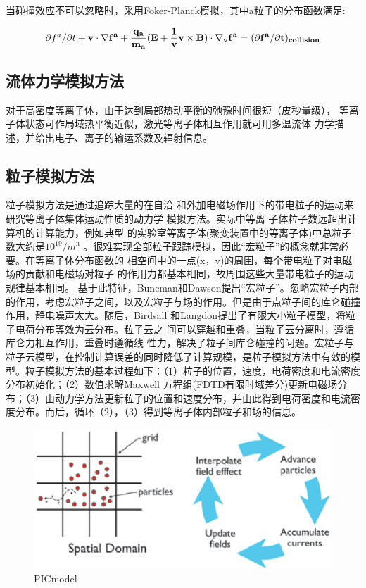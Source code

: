 当碰撞效应不可以忽略时，采用Foker-Planck模拟，其中a粒子的分布函数满足:

\begin{equation}
\label{eqn:foker_distribution}
\partial{f^a}/\partial{t}+\bf{v} \cdot {\nabla}f^a +  \dfrac{q_a }  
{m_a} 
(\bf{E}+ 
\dfrac{1}{v}  \bf{v} \times \bf{B}) \cdot  {\nabla}_v f^a = 
(\partial{f^a}/\partial{t})_{collision}
\end{equation}     


\subsection{流体力学模拟方法}
对于高密度等离子体，由于达到局部热动平衡的弛豫时间很短（皮秒量级），
等离子体状态可作局域热平衡近似，激光等离子体相互作用就可用多温流体
力学描述，并给出电子、离子的输运系数及辐射信息。
\subsection{粒子模拟方法}
粒子模拟方法是通过追踪大量的在自洽
和外加电磁场作用下的带电粒子的运动来研究等离子体集体运动性质的动力学
模拟方法。实际中等离
子体粒子数远超出计算机的计算能力，例如典型
的实验室等离子体(聚变装置中的等离子体)中总粒子数大约是$10^{19} /m^3$ 。很难实现全部粒子跟踪模拟，因此“宏粒子”的概念就非常必要。在等离子体分布函数的
相空间中的一点(x，v)的周围，每个带电粒子对电磁场的贡献和电磁场对粒子
的作用力都基本相同，故周围这些大量带电粒子的运动规律基本相同。
基于此特征，Buneman\cite{buneman1959dissipation}和Dawson\cite{dawson1962one}提出“宏粒子”。忽略宏粒子内部的作用，考虑宏粒子之间，以及宏粒子与场的作用。但是由于点粒子间的库仑碰撞作用，静电噪声太大。随后，Birdsall
和Langdon提出了有限大小粒子模型，将粒子电荷分布等效为云分布。粒子云之
间可以穿越和重叠，当粒子云分离时，遵循库仑力相互作用，重叠时遵循线
性力，解决了粒子间库仑碰撞的问题。宏粒子与粒子云模型，在控制计算误差的同时降低了计算规模，是粒子模拟方法中有效的模型。粒子模拟方法的基本过程如下：（1）粒子的位置，速度，电荷密度和电流密度分布初始化；（2）数值求解Maxwell 方程组(FDTD有限时域差分)更新电磁场分布；（3）由动力学方法更新粒子的位置和速度分布，并由此得到电荷密度和电流密度分布。而后，循环（2），（3）得到等离子体内部粒子和场的信息。
\begin{figure}[!htbp]
  \centering
  \includegraphics[width=\MyFactor\textwidth]{Img/PIC.eps}
  \caption{PICmodel}
  \label{fig:picmodel}
\end{figure}





